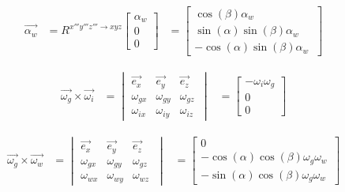 \begin{equation*}
\begin{split}
\overrightarrow{\alpha_{w}}&=R^{x'''y'''z''' \rightarrow xyz}
	\begin{bmatrix}
	\alpha_{w}\\
	0\\
	0\
	\end{bmatrix}
	&=\begin{bmatrix}
	\cos(\beta)\alpha_{w}\\
	\sin(\alpha)\sin(\beta)\alpha_{w}\\
	-\cos(\alpha)\sin(\beta)\alpha_{w}\
	\end{bmatrix}
\end{split}
\end{equation*}

\begin{equation*}
\begin{split}
\overrightarrow{\omega_{g}}\times\overrightarrow{\omega_{i}}
&=	\begin{vmatrix}
	\overrightarrow{e_{x}} & \overrightarrow{e_{y}} & \overrightarrow{e_{z}}\\
	\omega_{gx} & \omega_{gy} & \omega_{gz}\\
	\omega_{ix} & \omega_{iy} & \omega_{iz}\
	\end{vmatrix}
&=	\begin{bmatrix}
	-\omega_{i}\omega_{g}\\
	0\\
	0\
	\end{bmatrix}
\end{split}
\end{equation*}

\begin{equation*}
\begin{split}
\overrightarrow{\omega_{g}}\times\overrightarrow{\omega_{w}}
&=	\begin{vmatrix}
	\overrightarrow{e_{x}} & \overrightarrow{e_{y}} & \overrightarrow{e_{z}}\\
	\omega_{gx} & \omega_{gy} & \omega_{gz}\\
	\omega_{wx} & \omega_{wy} & \omega_{wz}\
	\end{vmatrix}
&=	\begin{bmatrix}
	0\\
	-\cos(\alpha)\cos(\beta)\omega_{g}\omega_{w}\\
	-\sin(\alpha)\cos(\beta)\omega_{g}\omega_{w}\
	\end{bmatrix}
\end{split}
\end{equation*}

